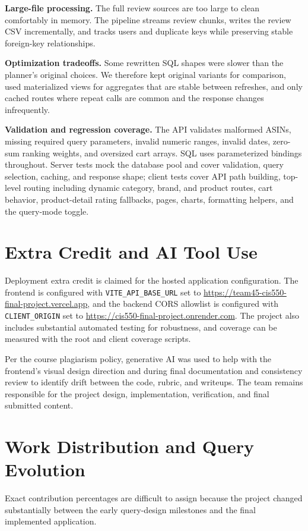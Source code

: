 \documentclass[10pt]{article}
\begin{document}
\textbf{Large-file processing.} The full review sources are too large to clean
comfortably in memory. The pipeline streams review chunks, writes the review CSV
incrementally, and tracks users and duplicate keys while preserving stable
foreign-key relationships.

\textbf{Optimization tradeoffs.} Some rewritten SQL shapes were slower than the
planner's original choices. We therefore kept original variants for comparison,
used materialized views for aggregates that are stable between refreshes, and
only cached routes where repeat calls are common and the response changes
infrequently.

\textbf{Validation and regression coverage.} The API validates malformed ASINs,
missing required query parameters, invalid numeric ranges, invalid dates,
zero-sum ranking weights, and oversized cart arrays. SQL uses parameterized
bindings throughout. Server tests mock the database pool and cover validation,
query selection, caching, and response shape; client tests cover API path
building, top-level routing including dynamic category, brand, and product
routes, cart behavior, product-detail rating fallbacks, pages, charts,
formatting helpers, and the query-mode toggle.

\section*{Extra Credit and AI Tool Use}
Deployment extra credit is claimed for the hosted application configuration. The
frontend is configured with \texttt{VITE\_API\_BASE\_URL} set to
\url{https://team45-cis550-final-project.vercel.app}, and the backend CORS
allowlist is configured with \texttt{CLIENT\_ORIGIN} set to
\url{https://cis550-final-project.onrender.com}. The project also includes
substantial automated testing for robustness, and coverage can be measured with
the root and client coverage scripts.

Per the course plagiarism policy, generative AI was used to help with the
frontend's visual design direction and during final documentation and
consistency review to identify drift between the code, rubric, and writeups. The
team remains responsible for the project design, implementation, verification,
and final submitted content.

\appendix
\section{Work Distribution and Query Evolution}
Exact contribution percentages are difficult to assign because the project
changed substantially between the early query-design milestones and the final
implemented application.
\end{document}
